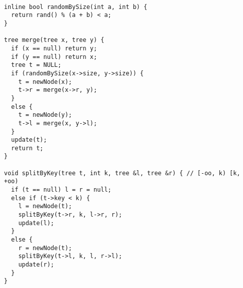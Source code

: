 \begin{lstlisting}

inline bool randomBySize(int a, int b) {
  return rand() % (a + b) < a;
}

tree merge(tree x, tree y) {
  if (x == null) return y;
  if (y == null) return x;
  tree t = NULL;
  if (randomBySize(x->size, y->size)) {
    t = newNode(x);
    t->r = merge(x->r, y);
  }
  else {
    t = newNode(y);
    t->l = merge(x, y->l);
  }
  update(t);
  return t;
}

void splitByKey(tree t, int k, tree &l, tree &r) { // [-oo, k) [k, +oo)
  if (t == null) l = r = null;
  else if (t->key < k) {
    l = newNode(t);
    splitByKey(t->r, k, l->r, r);
    update(l);
  }
  else {
    r = newNode(t);
    splitByKey(t->l, k, l, r->l);
    update(r);
  }
}

\end{lstlisting}
